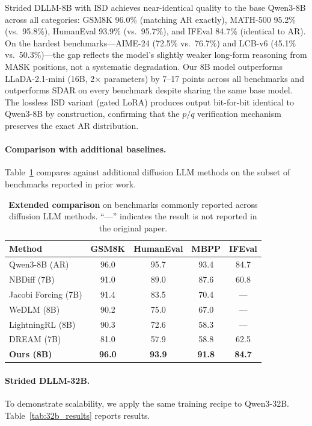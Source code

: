 Strided DLLM-8B with ISD achieves near-identical quality to the base Qwen3-8B across all categories: GSM8K 96.0\% (matching AR exactly), MATH-500 95.2\% (vs.\ 95.8\%), HumanEval 93.9\% (vs.\ 95.7\%), and IFEval 84.7\% (identical to AR). On the hardest benchmarks---AIME-24 (72.5\% vs.\ 76.7\%) and LCB-v6 (45.1\% vs.\ 50.3\%)---the gap reflects the model's slightly weaker long-form reasoning from MASK positions, not a systematic degradation. Our 8B model outperforms LLaDA-2.1-mini (16B, 2$\times$ parameters) by 7--17 points across all benchmarks and outperforms SDAR on every benchmark despite sharing the same base model. The lossless ISD variant (gated LoRA) produces output bit-for-bit identical to Qwen3-8B by construction, confirming that the $p/q$ verification mechanism preserves the exact AR distribution.

\paragraph{Comparison with additional baselines.}
Table~\ref{tab:extended} compares against additional diffusion LLM methods on the subset of benchmarks reported in prior work.

\begin{table}[t]
\centering
\caption{\textbf{Extended comparison} on benchmarks commonly reported across diffusion LLM methods. ``---'' indicates the result is not reported in the original paper.}
\label{tab:extended}
\small
\begin{tabular}{lcccc}
\toprule
\textbf{Method} & \textbf{GSM8K} & \textbf{HumanEval} & \textbf{MBPP} & \textbf{IFEval} \\
\midrule
Qwen3-8B (AR) & 96.0 & 95.7 & 93.4 & 84.7 \\
\midrule
NBDiff (7B) & 91.0 & 89.0 & 87.6 & 60.8 \\
Jacobi Forcing (7B) & 91.4 & 83.5 & 70.4 & --- \\
WeDLM (8B) & 90.2 & 75.0 & 67.0 & --- \\
LightningRL (8B) & 90.3 & 72.6 & 58.3 & --- \\
DREAM (7B) & 81.0 & 57.9 & 58.8 & 62.5 \\
\midrule
\textbf{Ours (8B)} & \textbf{96.0} & \textbf{93.9} & \textbf{91.8} & \textbf{84.7} \\
\bottomrule
\end{tabular}
\end{table}

\paragraph{Strided DLLM-32B.}
To demonstrate scalability, we apply the same training recipe to Qwen3-32B. Table~\ref{tab:32b_results} reports results.

